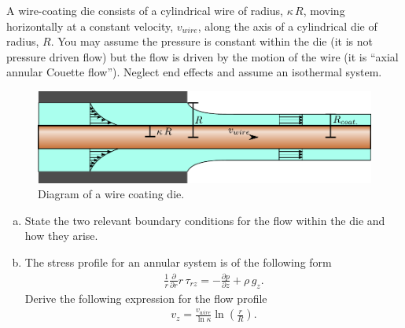 \documentclass[calculator,datasheet,handbook,solutions]{exam}
\begin{document}
\pagebreak
\begin{question}
  A wire-coating die consists of a cylindrical wire of radius,
  $\kappa\,R$, moving horizontally at a constant velocity, $v_{wire}$,
  along the axis of a cylindrical die of radius, $R$. You may assume
  the pressure is constant within the die (it is not pressure driven
  flow) but the flow is driven by the motion of the wire (it is
  ``axial annular Couette flow''). Neglect end effects and assume an
  isothermal system.
  \begin{figure}[ht]%
    \begin{center}%
      \includegraphics[width=0.8\linewidth,clip]{figures/wire_coating_die}%
    \end{center}
    \caption{\label{fig:wire_coating} Diagram of a wire coating die.}
  \end{figure}
  \begin{enumerate}[a)]
  \item State the two relevant boundary conditions for the flow within
    the die and how they arise.  
  \item The stress profile for an annular system is of the following
    form
    \begin{align*}
      \frac{1}{r}\frac{\partial}{\partial r} r\,\tau_{rz} = -\frac{\partial p}{\partial z}+\rho\,g_z.
    \end{align*}
    Derive the following expression for the flow profile
    \begin{align*}
      v_z = \frac{v_{wire}}{\ln \kappa}\ln\left(\frac{r}{R}\right).
    \end{align*}
\end{enumerate}
\end{question}
\end{document}
